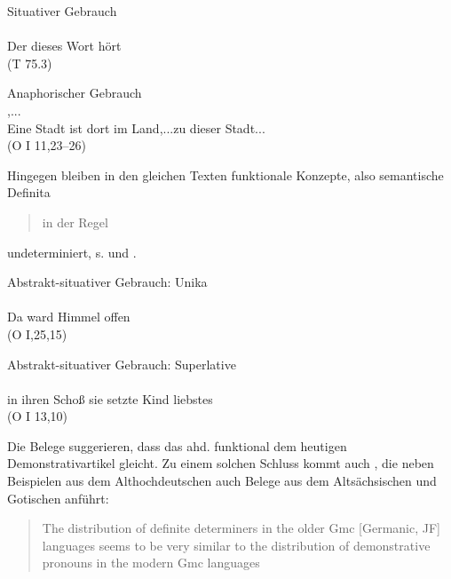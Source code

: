\begin{exe} 
\ex \label{ex:demske-prag1}
	Situativer Gebrauch \\
	\gll {}    \\
		Der dieses Wort hört\\
	\trans {} (T 75.3)
\end{exe}

\begin{exe} 
\ex \label{ex:demske-prag2} 
	Anaphorischer Gebrauch \\
	\gll {}     ,...   \\
		Eine Stadt ist dort im Land,...zu dieser Stadt...\\
	\trans  {} (O I 11,23--26)
\end{exe}

\noindent 
Hingegen bleiben in den gleichen Texten funktionale Konzepte, also semantische Definita \blockcquote[114]{Demske2001}{in der Regel} undeterminiert, s.  und . 

\begin{exe} 
\ex \label{ex:demske-sem1} 
	Abstrakt-situativer Gebrauch: Unika \\
	\gll {}    \\
		Da ward Himmel offen \\
	\trans {} (O I,25,15) 
\end{exe}

\begin{exe} 
\ex \label{ex:demske-sem2} 
	Abstrakt-situativer Gebrauch: Superlative \\
	\gll {}      \\
		 in ihren Schoß sie setzte Kind liebstes\\
	\trans  {} (O I 13,10)
\end{exe}

\noindent 
Die Belege suggerieren, dass das ahd.  funktional dem heutigen Demonstrativartikel gleicht. Zu einem solchen Schluss kommt auch \textcite{Philippi1997}, die neben Beispielen aus dem Althochdeutschen auch Belege aus dem  Altsächsischen und Gotischen anführt: \blockcquote[86]{Philippi1997}{The distribution of definite determiners in the older Gmc [Germanic, JF] languages seems to be very similar to the distribution of demonstrative pronouns in the
modern Gmc languages}. 

